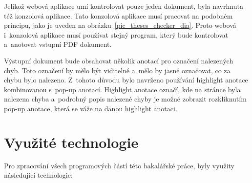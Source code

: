 Jelikož webová aplikace umí kontrolovat pouze jeden dokument, byla navrhnuta
též konzolová aplikace. Tato konzolová aplikace musí pracovat na podobném
principu, jako je uveden na obrázku~\ref{pic_theses_checker_dia}. Proto
webová i~konzolová aplikace musí používat stejný program, který bude kontrolovat
a~anotovat vstupní PDF dokument.  

Výstupní dokument bude obsahovat několik anotací pro označení nalezených chyb.
Toto označení by mělo být viditelné a~mělo by jasně označovat, co za chybu bylo
nalezeno. Z~tohoto důvodu bylo navrženo používání highlight anotace kombinovanou
s~pop-up anotací. Highlight anotace označí, kde na stránce byla nalezena chyba
a~podrobný popis nalezené chyby je možné zobrazit rozkliknutím pop-up anotace,
která se váže na danou highlight anotaci.



\section{Využité technologie}
Pro zpracování všech programových částí této bakalářské práce, byly
využity následující technologie:

